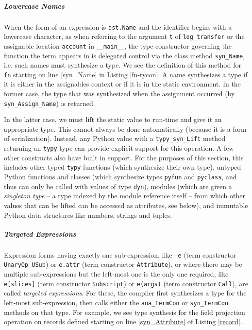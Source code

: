 \documentclass[preprint,10pt]{sigplanconf}
\newcommand{\lip}[1]{\lstinline[language=Python,basicstyle=\ttfamily\small,deletendkeywords={tuple,buffer,map}]{#1}}
\begin{document}
\subparagraph{Lowercase Names} When the form of an expression is \lip{ast.Name} and the identifier begins with a lowercase character, as when referring to the argument \lip{t} of \lip{log_transfer} or the assignable location \lip{account} in \lip{__main__}, the type constructor governing the function the term appears in is delegated control  via the class method \lip{syn_Name}, i.e. such names must synthesize a type. We see the definition of this method for \lip{fn} starting on line \ref{syn_Name} in Listing \ref{fn-tycon}. A name synthesizes a type if it is either in the assignables context or if it is in the static environment. In the former case, the type that was synthesized when the assignment occurred (by \lip{syn_Assign_Name}) is returned. 

In the latter case, we must lift the static value to run-time and give it an appropriate type. This cannot always be done automatically (because it is a form of serialization). Instead, any Python value with a \lip{typy_syn_Lift} method returning an \lip{typy} type can provide explicit support for this operation. A few other constructs also have built in support. For the purposes of this section, this includes other typed \texttt{typy} functions (which synthesize their own type), untyped Python functions and classes (which synthesize types \lip{pyfun} and \lip{pyclass}, and thus can only be called with values of type \lip{dyn}), modules (which are given a \emph{singleton type} -- a type indexed by the module reference itself -- from which other values that can be lifted can be accessed as attributes, see below), and immutable Python data structures like numbers, strings and tuples. %


\subparagraph{Targeted Expressions} Expression forms having exactly one sub-expression, like \lip{-e} (term constructor \lip{UnaryOp_USub}) or \lip{e.attr} (term constructor \lip{Attribute}), or where there may be multiple sub-expressions but the left-most one is the only one required, like \lip{e[slices]} (term constructor  \lip{Subscript}) or \lip{e(args)} (term constructor \lip{Call}), are called \emph{targeted expressions}. For these, the compiler first synthesizes a type for the left-most sub-expression, then calls either the \lip{ana_TermCon} or \lip{syn_TermCon} methods on that type. For example, we see type synthesis for the field projection operation on records defined starting on line \ref{syn_Attribute} of Listing \ref{record}.%
\end{document}
